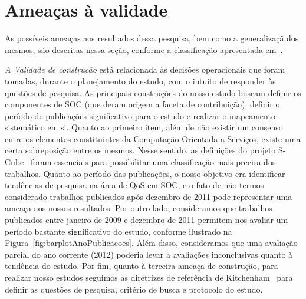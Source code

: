 \section{Amea\c cas à validade}\label{sec:ameacas}

As poss\'{i}veis amea\c{c}as aos resultados dessa pesquisa, bem como a generaliza\c c\~{a} dos mesmos, s\~{a}o descritas nessa se\c c\~{a}o, conforme a classifica\c c\~{a}o apresentada em~\cite{leedy1980practical}. 

\emph{A Validade de constru\c c\~{a}o} est\'{a} relacionada
\`{a}s decis\~{o}es operacionais que foram tomadas, durante o
planejamento do estudo, com o intuito de responder \`{a}s quest\~{o}es de
pesquisa. As principais constru\c{c}\~{o}es do nosso estudo buscam definir os componentes de SOC (que deram 
origem a faceta de contribui\c c\~{a}o), definir o per\'{i}odo de publica\c{c}\~{o}es significativo para o estudo e realizar o mapeamento sistemático em si. 
Quanto ao primeiro item, al\'{e}m de n\~{a}o existir um consenso entre os elementos constituintes da Computa\c c\~{a}o Orientada a Servi\c cos, existe uma certa 
sobreposi\c c\~{a}o entre os mesmos. Nesse sentido, as defini\c c\~{o}es do projeto S-Cube~\cite{SCube-FINALREPORT}  foram essenciais para 
possibilitar uma classifica\c c\~{a}o mais precisa dos trabalhos.
Quanto ao per\'{i}odo das publica\c c\~{o}es, o nosso objetivo era identificar tend\^{e}ncias de pesquisa na \'{a}rea de QoS em SOC, e o fato de n\~{a}o termos considerado trabalhos publicados ap\'{o}s dezembro de 2011 pode representar uma amea\c ca aos nossos resultados. Por outro lado, consideramos que trabalhos publicados entre janeiro de 2009 e dezembro de 2011 permitem-nos avaliar um per\'{i}odo bastante significativo do estudo, conforme ilustrado na Figura~\ref{fig:barplotAnoPublicacoes}. Al\'{e}m disso, consideramos que uma avalia\c c\~{a}o parcial do ano corrente (2012) poderia levar a avalia\c{c}\~{o}es inconclusivas quanto \`{a} tend\^{e}ncia do estudo. Por fim, quanto \`{a} terceira amea\c{c}a de constru\c{c}\~{a}o, para realizar nosso estudos seguimos as diretrizes de refer\^{e}ncia de Kitchenham~\cite{kitchenham:techReport2007} para definir as quest\~{o}es de pesquisa, crit\'{e}rio de busca e protocolo do estudo.


